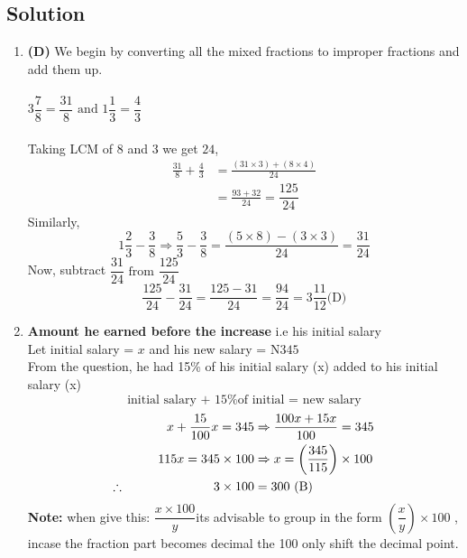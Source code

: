 \subsection{Solution}
\begin{multicols}{2}
\begin{enumerate}[label={\textbf{\arabic*.}}]
    \item \textbf{(D)} We begin by converting all the mixed fractions to improper fractions and add them up.\\\\
    \(3\dfrac{7}{8} = \dfrac{31}{8} \text { and } 1\dfrac{1}{3} = \dfrac{4}{3}\) \\\\
    Taking LCM of \(8\) and \(3\) we get \(24\),
    \begin{align*}
    \frac{31}{8} + \frac{4}{3} &= \frac{(31 \times 3) + (8 \times 4) }{24} \\
    &= \frac{93 + 32}{24} = \dfrac{125}{24}
    \end{align*}
    Similarly, 
    \[1\frac{2}{3} - \frac{3}{8} \Rightarrow \frac{5}{3} - \frac{3}{8} = \frac{(5 \times 8) - (3 \times 3)}{24} = \frac{31}{24}\]
    Now, subtract \(\dfrac{31}{24} \text { from } \dfrac{125}{24}\)
    \[\frac{125}{24} - \frac{31}{24} = \frac{125 - 31}{24} = \frac{94}{24} = 3\frac{11}{12} \text{(D)} \]
    
    \item \textbf{Amount he earned before the increase} i.e his initial salary \\
    Let initial salary = \(x\) and his new salary = N\(345\)\\
    From the question, he had 15\% of his initial salary (x) added to his initial salary (x)
    \[\text{initial salary + 15\% of initial = new salary}\]
    \begin{align*}
    x + \dfrac{15}{100}x = 345 &\Rightarrow \dfrac{100x + 15x}{100} = 345 \\
    115x = 345 \times 100 &\Rightarrow x = \left(\frac{345}{115}\right) \times 100 \\
    \therefore \hspace{70px} 3 \times 100 &= 300 \text{ (B)}\\
    \end{align*}
    \textbf{Note:} when give this: \( \dfrac{x \times 100}{y}\)its advisable to group in the form
    \(\left(\dfrac{x}{y}\right) \times 100\) , incase the fraction part becomes decimal the 100 only shift the
    decimal point. 


\end{enumerate}
\end{multicols}

